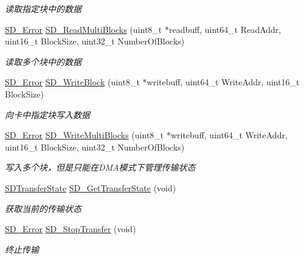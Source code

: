 \begin{DoxyCompactItemize}
\begin{DoxyCompactList}\small\item\em 读取指定块中的数据 \end{DoxyCompactList}\item 
\hyperlink{group__sd__card_gacff91fa68daa1d1ee967b5b3fb3dbd8c}{S\+D\+\_\+\+Error} \hyperlink{group__sd__card_ga56b7336165f2631d9142a513ea2d0d17}{S\+D\+\_\+\+Read\+Multi\+Blocks} (uint8\+\_\+t $\ast$readbuff, uint64\+\_\+t Read\+Addr, uint16\+\_\+t Block\+Size, uint32\+\_\+t Number\+Of\+Blocks)
\begin{DoxyCompactList}\small\item\em 读取多个块中的数据 \end{DoxyCompactList}\item 
\hyperlink{group__sd__card_gacff91fa68daa1d1ee967b5b3fb3dbd8c}{S\+D\+\_\+\+Error} \hyperlink{group__sd__card_gab1eef7c1ff23ea746db504463d301a8b}{S\+D\+\_\+\+Write\+Block} (uint8\+\_\+t $\ast$writebuff, uint64\+\_\+t Write\+Addr, uint16\+\_\+t Block\+Size)
\begin{DoxyCompactList}\small\item\em 向卡中指定块写入数据 \end{DoxyCompactList}\item 
\hyperlink{group__sd__card_gacff91fa68daa1d1ee967b5b3fb3dbd8c}{S\+D\+\_\+\+Error} \hyperlink{group__sd__card_ga64baac72a75a2c522e837935009cbe93}{S\+D\+\_\+\+Write\+Multi\+Blocks} (uint8\+\_\+t $\ast$writebuff, uint64\+\_\+t Write\+Addr, uint16\+\_\+t Block\+Size, uint32\+\_\+t Number\+Of\+Blocks)
\begin{DoxyCompactList}\small\item\em 写入多个块，但是只能在\+D\+M\+A模式下管理传输状态 \end{DoxyCompactList}\item 
\hyperlink{group__sd__card_gace0484a459648257c3eae8ea60f64fbf}{S\+D\+Transfer\+State} \hyperlink{group__sd__card_ga2dd79455185c28bd21964d113a38d110}{S\+D\+\_\+\+Get\+Transfer\+State} (void)
\begin{DoxyCompactList}\small\item\em 获取当前的传输状态 \end{DoxyCompactList}\item 
\hyperlink{group__sd__card_gacff91fa68daa1d1ee967b5b3fb3dbd8c}{S\+D\+\_\+\+Error} \hyperlink{group__sd__card_gad3dc52f076ae8145e105cb4d8a37b043}{S\+D\+\_\+\+Stop\+Transfer} (void)
\begin{DoxyCompactList}\small\item\em 终止传输 \end{DoxyCompactList}\item 

\end{DoxyCompactItemize}

